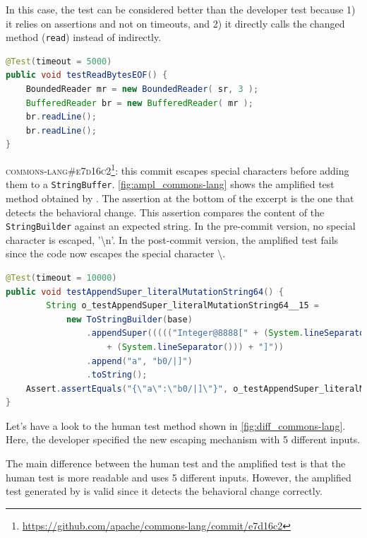 In this case, the \DCI test can be considered better than the developer test because
1) it relies on assertions and not on timeouts, and
2) it directly calls the changed method (\texttt{read}) instead of indirectly. 

\begin{lstlisting}[language=java,caption=Developer test for commit \textsc{81210eb} of commons-io.,label=fig:diff_commons-io]
@Test(timeout = 5000)
public void testReadBytesEOF() {
	BoundedReader mr = new BoundedReader( sr, 3 );
	BufferedReader br = new BufferedReader( mr );
	br.readLine();
	br.readLine();
}
\end{lstlisting}

\textsc{commons-lang\#e7d16c2}\footnote{\url{https://github.com/apache/commons-lang/commit/e7d16c2}}: this commit escapes special characters before adding them to a \texttt{StringBuffer}.
\autoref{fig:ampl_commons-lang} shows the amplified test method obtained by \DCII.
The assertion at the bottom of the excerpt is the one that detects the behavioral change.
This assertion compares the content of the \texttt{StringBuilder} against an expected string.
In the pre-commit version, no special character is escaped, \eg '\textbackslash n'.
In the post-commit version, the amplified test fails since the code now escapes the special character \textbackslash.

\begin{lstlisting}[language=java,caption=Test generated by \DCII that detects the behavioral change of \textsc{e7d16c2} in commons-lang.,label=fig:ampl_commons-lang]
@Test(timeout = 10000)
public void testAppendSuper_literalMutationString64() {
		String o_testAppendSuper_literalMutationString64__15 = 
			new ToStringBuilder(base)
				.appendSuper((((("Integer@8888[" + (System.lineSeparator())) + "  null") 
					+ (System.lineSeparator())) + "]"))
				.append("a", "b0/|]")
				.toString();
	Assert.assertEquals("{\"a\":\"b0/|]\"}", o_testAppendSuper_literalMutationString64__15);
}
\end{lstlisting}

Let's have a look to the human test method shown in \autoref{fig:diff_commons-lang}.
Here, the developer specified the new escaping mechanism with 5 different inputs.

The main difference between the human test and the amplified test is that the human test is more readable and uses 5 different inputs.
However, the amplified test generated by \DCI is valid since it detects the behavioral change correctly.


